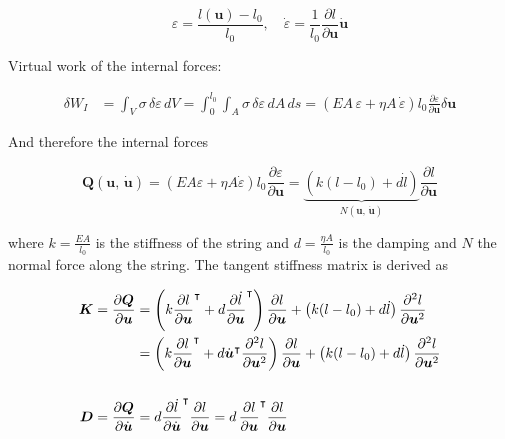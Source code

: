 \begin{equation}
\varepsilon = \frac{l(\boldsymbol{u}) - l_{0}}{l_{0}}, \quad \dot{\varepsilon} = \frac{1}{l_{0}}\frac{\partial l}{\partial \boldsymbol{u}}\dot{\boldsymbol{u}}
\end{equation}

Virtual work of the internal forces:

\begin{align}
\delta W_{I} &= \int_{V} \sigma\,\delta\varepsilon\,dV = \int_{0}^{l_{0}}\int_{A} \sigma\,\delta\varepsilon\,dA\,ds = \left(EA\,\varepsilon + \eta A\,\dot{\varepsilon}\right)l_{0}\frac{\partial\varepsilon}{\partial\boldsymbol{u}}\delta\boldsymbol{u}
\end{align}

And therefore the internal forces

\begin{equation}
\boldsymbol{Q}(\boldsymbol{u},\,\dot{\boldsymbol{u}}) = \left(EA\varepsilon + \eta A\dot{\varepsilon}\right)l_{0}\frac{\partial\varepsilon}{\partial\boldsymbol{u}} = \underbrace{\left(k(l - l_{0}) + d\dot{l}\right)}_{N(\boldsymbol{u},\,\dot{\boldsymbol{u}})}\frac{\partial l}{\partial\boldsymbol{u}}
\end{equation}

where $k = \frac{EA}{l_{0}}$ is the stiffness of the string and $d = \frac{\eta A}{l_{0}}$ is the damping and $N$ the normal force along the string.
The tangent stiffness matrix is derived as

\begin{align}
\boldsymbol{K} = \frac{\partial\boldsymbol{Q}}{\partial\boldsymbol{u}} &= \left(k\frac{\partial l}{\partial\boldsymbol{u}}^\intercal + d\frac{\partial\dot{l}}{\partial\boldsymbol{u}}^\intercal\right)\frac{\partial l}{\partial\boldsymbol{u}} + \left(k(l - l_{0}) + d\dot{l}\right)\frac{\partial^2 l}{\partial\boldsymbol{u}^2} \notag \\
&= \left(k\frac{\partial l}{\partial\boldsymbol{u}}^\intercal + d\dot{\boldsymbol{u}}^\intercal\frac{\partial^2 l}{\partial\boldsymbol{u}^2}\right)\frac{\partial l}{\partial\boldsymbol{u}} + \left(k(l - l_{0}) + d\dot{l}\right)\frac{\partial^2 l}{\partial\boldsymbol{u}^2} \\
\notag \\
\boldsymbol{D} = \frac{\partial\boldsymbol{Q}}{\partial\dot{\boldsymbol{u}}} &= d\frac{\partial\dot{l}}{\partial\dot{\boldsymbol{u}}}^\intercal\frac{\partial l}{\partial\boldsymbol{u}} = d\,\frac{\partial l}{\partial\boldsymbol{u}}^\intercal\frac{\partial l}{\partial\boldsymbol{u}}
\end{align}

